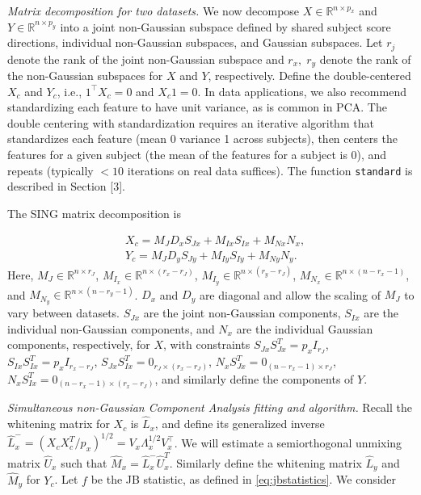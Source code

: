 \emph{Matrix decomposition for two datasets.} We now decompose \(X \in \mathbb{R} ^{n \times p_{x}}\) and \(Y \in \mathbb{R} ^{n \times p_{y}}\) into a joint non-Gaussian subspace defined by shared subject score directions, individual non-Gaussian subspaces, and Gaussian subspaces. Let \(r_{j}\) denote the rank of the joint non-Gaussian subspace and \(r_{x},\;r_{y}\) denote the rank of the non-Gaussian subspaces for \(X\) and \(Y\), respectively. Define the double-centered \(X_{c}\) and \(Y_{c}\), i.e., \(1^\top X_c = 0\) and \(X_c 1 = 0\). In data applications, we also recommend standardizing each feature to have unit variance, as is common in PCA. The double centering with standardization requires an iterative algorithm that standardizes each feature (mean 0 variance 1 across subjects), then centers the features for a given subject (the mean of the features for a subject is 0), and repeats (typically \(<10\) iterations on real data suffices). The function \texttt{standard} is described in Section {[}3{]}.

The SING matrix decomposition is

\begin{equation}
\begin{split}
& X_{c}=M_{J}D_{x}S_{Jx}+M_{Ix}S_{Ix}+M_{Nx}N_{x},\\
& Y_{c}=M_{J}D_{y}S_{Jy}+M_{Iy}S_{Iy}+M_{Ny}N_{y}.
\end{split}
\label{eq:two}
\end{equation}
Here, \(M_{J}\in \mathbb{R}^{n\times r_{J}}\), \(M_{I_{x}}\in \mathbb{R}^{n\times (r_{x}-r_{J})}\), \(M_{I_{y}}\in \mathbb{R}^{n\times (r_{y}-r_{J})}\), \(M_{N_{x}}\in \mathbb{R}^{n\times (n-r_{x}-1)}\), and \(M_{N_{y}}\in \mathbb{R}^{n\times (n-r_{y}-1)}\). \(D_{x}\) and \(D_{y}\) are diagonal and allow the scaling of \(M_J\) to vary between datasets. \(S_{Jx}\) are the joint non-Gaussian components, \(S_{Ix}\) are the individual non-Gaussian components, and \(N_{x}\) are the individual Gaussian components, respectively, for \(X\), with constraints \(S_{Jx}S_{Jx}^{T}=p_{x}I_{r_{J}}\), \(S_{Ix}S_{Ix}^{T}=p_{x}I_{r_{x}-r_{J}}\), \(S_{Jx}S_{Ix}^{T}=0_{r_J\times (r_{x}-r_J)}\), \(N_{x}S_{Jx}^{T}=0_{(n-r_{x}-1)\times r_J}\), \(N_{x}S_{Ix}^{T}=0_{(n-r_{x}-1)\times (r_{x}-r_J)}\), and similarly define the components of \(Y\).

\emph{Simultaneous non-Gaussian Component Analysis fitting and algorithm.} Recall the whitening matrix for \(X_{c}\) is \(\widehat{L}_{x}\), and define its generalized inverse \(\widehat{L}_{x}^{-}=(X_{c}X_{c}^{T}/p_{x})^{1/2}=V_{x} \Lambda_{x}^{1/ 2} V_{x}^{\top}\). We will estimate a semiorthogonal unmixing matrix \(\widehat{U}_x\) such that \(\widehat{M}_{x} = \widehat{L}_{x}^{-}\widehat{U}_{x}^{T}\). Similarly define the whitening matrix \(\widehat{L}_{y}\) and \(\widehat{M}_{y}\) for \(Y_{c}\). Let \(f\) be the JB statistic, as defined in \eqref{eq:jbstatistics}. We consider

